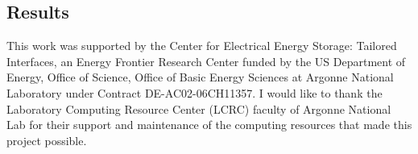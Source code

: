 \documentclass[aps,prl,reprint,superscriptaddress,showkeys]{revtex4-1}
\begin{document}
\subsection{Results}



\begin{acknowledgments}
This work was supported by the Center for Electrical Energy Storage: Tailored Interfaces, an Energy Frontier Research Center funded 
by the US Department of Energy, Office of Science, Office of Basic Energy Sciences at Argonne National Laboratory under Contract DE-AC02-06CH11357.
I would like to thank the Laboratory Computing Resource Center (LCRC) faculty of Argonne National Lab for their support and maintenance of the computing resources that made this project possible. 
\end{acknowledgments}


\end{document}

